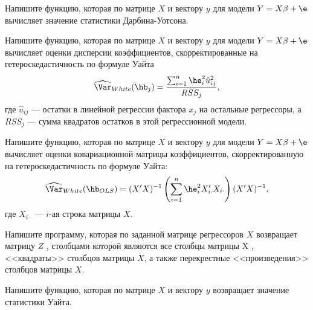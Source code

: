 \documentclass[pdftex,11pt,openany]{book}\usepackage[]{graphicx}\usepackage[]{color}
\begin{document}
\begin{solution}
\end{solution}


\begin{problem}
Напишите функцию, которая по матрице $X$ и вектору $y$ для модели $Y=X\beta+\e$ вычисляет значение статистики Дарбина-Уотсона.
\end{problem}

\begin{solution}
\end{solution}

\begin{problem}
Напишите функцию, которая по матрице $X$ и вектору $y$ для модели $Y=X\beta+\e$ вычисляет оценки дисперсии коэффициентов, скорректированные на гетероскедастичность по формуле Уайта 
\[
\widehat{\Var}_{White}(\hb_j)=\frac{\sum_{i=1}^{n}\he_i^2\hat{u}_{ij}^2}{RSS_j},
\]
где $\hat{u}_{ij}$ --- остатки в линейной регрессии фактора $x_j$ на остальные регрессоры, а $RSS_j$ --- сумма квадратов остатков в этой регрессионной модели.
\end{problem}

\begin{solution}
\end{solution}


\begin{problem}
Напишите функцию, которая по матрице $X$ и вектору $y$ для модели $Y=X\beta+\e$ вычисляет оценки ковариационной матрицы коэффициентов, скорректированную на гетероскедастичность по формуле Уайта: 
\[
\widehat{\Var}_{White}(\hb_{OLS})=(X'X)^{-1} \left( \sum_{i=1}^n \he_i^2 X_{i\cdot}'X_{i\cdot} \right) (X'X)^{-1},
\] 
где $X_{i\cdot}$ --- $i$-ая строка матрицы $X$.
\end{problem}

\begin{solution}
\end{solution}

\begin{problem}
Напишите программу, которая по заданной матрице регрессоров $X$
возвращает матрицу $Z$ , столбцами которой являются все столбцы матрицы X ,
<<квадраты>> столбцов матрицы $X$, а также перекрестные <<произведения>> столбцов
матрицы $X$.
\end{problem}

\begin{solution}
\end{solution}


\begin{problem}
Напишите функцию, которая по матрице $X$ и вектору $y$ возвращает
значение статистики Уайта.
\end{problem}
\end{document}
